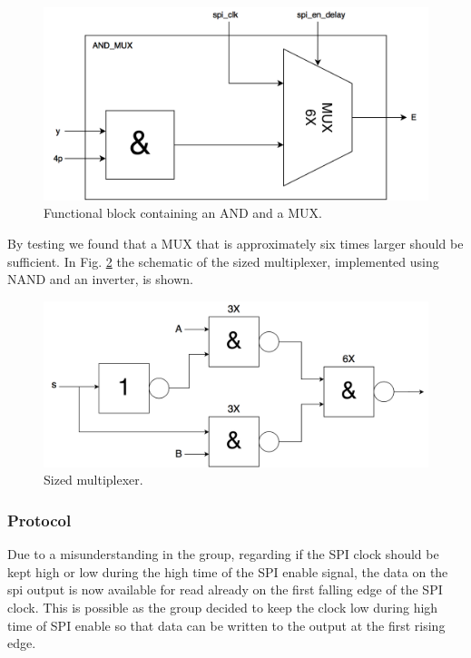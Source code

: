 \begin{figure}[H]
\centering
\captionsetup{justification=centering}
\includegraphics[scale=0.2]{../figures/AND_MUX.png}
\caption{Functional block containing an AND and a MUX.}
\label{and_mux}
\end{figure}

\raggedright By testing we found that a MUX that is approximately six times larger should be sufficient. In Fig. \ref{mux6x} the schematic of the sized multiplexer, implemented using NAND and an inverter, is shown.

\begin{figure}[H]
\centering
\captionsetup{justification=centering}
\includegraphics[scale=0.2]{../figures/MUX6X.png}
\caption{Sized multiplexer.}
\label{mux6x}
\end{figure}


\subsubsection{Protocol}
Due to a misunderstanding in the group, regarding if the SPI clock should be kept high or low during the high time of the SPI enable signal, the data on the spi output is now available for read already on the first falling edge of the SPI clock. This is possible as the group decided to keep the clock low during high time of SPI enable so that data can be written to the output at the first rising edge.



